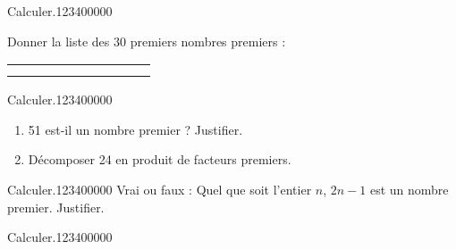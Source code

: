 \begin{pageAD}

\begin{ExoCad}{Calculer.}{1234}{0}{0}{0}{0}{0}

Donner la liste des 30 premiers nombres premiers : 

\begin{tabularx}{\textwidth}{|X|X|X|X|X|X|X|X|X|X|}
\hline 
 &   &   &   &   & &  &   &   &   \\  
\hline 
 &   &   &   &   & &  &   &   &   \\  
\hline 
 &   &   &   &   & &  &   &   &   \\  
\hline 
\end{tabularx} 

\end{ExoCad}




\begin{ExoCad}{Calculer.}{1234}{0}{0}{0}{0}{0}


\begin{enumerate}
\item  51 est-il un nombre premier ? Justifier. 
\item  Décomposer 24 en produit de facteurs premiers.
\end{enumerate}

\end{ExoCad}


\begin{ExoCad}{Calculer.}{1234}{0}{0}{0}{0}{0}
Vrai ou faux : Quel que soit l'entier $n$, $2n-1$ est un nombre premier. Justifier.
\end{ExoCad}



\begin{ExoCad}{Calculer.}{1234}{0}{0}{0}{0}{0}


 
\end{ExoCad}



 
\end{pageAD}


